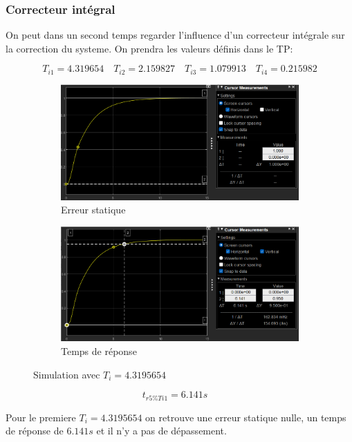 \documentclass[12pt, a4paper]{report}
\begin{document}
\subsubsection{Correcteur intégral}
On peut dans un second temps regarder l'influence d'un correcteur intégrale sur la correction du systeme. On prendra les valeurs définis dans le TP:

\[
    T_{i1} = 4.319654 \quad T_{i2} = 2.159827 \quad T_{i3} = 1.079913 \quad T_{i4} = 0.215982
\]

\begin{figure}[H]
    \begin{subfigure}[h!]{0.4\linewidth}
        \includegraphics[width=\linewidth]{sim2ti1erreur.png}
        \caption{Erreur statique}
    \end{subfigure}
    \hfill    
    \begin{subfigure}[h!]{0.4\linewidth}
        \includegraphics[width=\linewidth]{sim2ti1tr.png}
        \caption{Temps de réponse}
    \end{subfigure}
    \caption{Simulation avec $T_i = 4.3195654$}
    \label{fig:sim2KTi1}
\end{figure}

\[
    t_{r5\%Ti1} =   6.141s \quad
\]

Pour le premiere $T_i = 4.3195654$ on retrouve une erreur statique nulle, un temps de réponse de $6.141s$ et il n'y a pas de dépassement.
\end{document}
